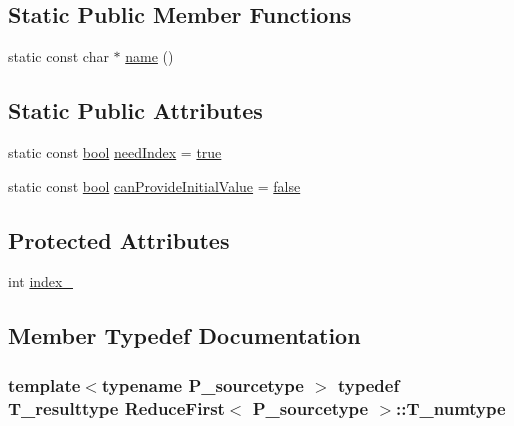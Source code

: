 \subsection*{Static Public Member Functions}
\begin{DoxyCompactItemize}
\item 
static const char $\ast$ \hyperlink{classReduceFirst_a9b0f0388836435c4ee449b35473d3006}{name} ()
\end{DoxyCompactItemize}
\subsection*{Static Public Attributes}
\begin{DoxyCompactItemize}
\item 
static const \hyperlink{compiler_8h_abb452686968e48b67397da5f97445f5b}{bool} \hyperlink{classReduceFirst_a9ef141fc1550aeda6bdec3316dee391d}{need\+Index} = \hyperlink{compiler_8h_a41f9c5fb8b08eb5dc3edce4dcb37fee7}{true}
\item 
static const \hyperlink{compiler_8h_abb452686968e48b67397da5f97445f5b}{bool} \hyperlink{classReduceFirst_a55276e230eacdc4d2d155d0678cd910f}{can\+Provide\+Initial\+Value} = \hyperlink{compiler_8h_a65e9886d74aaee76545e83dd09011727}{false}
\end{DoxyCompactItemize}
\subsection*{Protected Attributes}
\begin{DoxyCompactItemize}
\item 
int \hyperlink{classReduceFirst_a32567182717fb8db53370e3c294d7879}{index\+\_\+}
\end{DoxyCompactItemize}


\subsection{Member Typedef Documentation}
\hypertarget{classReduceFirst_a2ad67486354b89d10192c554f28801eb}{}
\subsubsection[{T\+\_\+numtype}]{\setlength{\rightskip}{0pt plus 5cm}template$<$typename P\+\_\+sourcetype $>$ typedef {\bf T\+\_\+resulttype} {\bf Reduce\+First}$<$ P\+\_\+sourcetype $>$\+::{\bf T\+\_\+numtype}}\label{classReduceFirst_a2ad67486354b89d10192c554f28801eb}
\hypertarget{classReduceFirst_a011cd3328393e76bf26501a6b8652d09}{}
